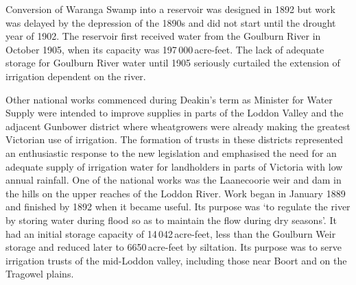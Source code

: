 Conversion of Waranga Swamp into a
reservoir  was
designed in 1892 but work was delayed by the depression of the 1890s
and did not start until the drought year of 1902.  The
reservoir first received water from the Goulburn River
 in October 1905, when its capacity was
197\,000\,acre-feet.  The lack of adequate storage for Goulburn River
water until 1905 seriously curtailed the extension of irrigation
dependent on the river.

Other national works commenced during Deakin's term as Minister for
Water Supply were intended to improve supplies in parts of the Loddon
Valley  and the adjacent
Gunbower district where
wheatgrowers were already making the greatest Victorian
use of irrigation.  The formation of trusts in these districts
represented an enthusiastic response to the new legislation and
emphasised the need for an adequate supply of irrigation water for
landholders in parts of Victoria with low annual rainfall.  One of the
national works was the Laanecoorie weir
 and dam in the hills on
the upper reaches of the Loddon River.  Work began in January 1889 and
finished by 1892 when it became useful.  Its purpose was `to regulate
the river by storing water during flood so as to maintain
the flow during dry seasons'.  It had an initial storage capacity of
14\,042\,acre-feet, less than the Goulburn Weir 
storage and reduced later to 6650\,acre-feet by siltation.  Its
purpose was to serve irrigation trusts of the mid-Loddon valley,
including those near Boort  and on the Tragowel
plains.

